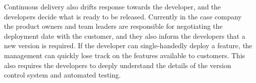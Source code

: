 \documentclass[english]{tktltiki2}
\theoremstyle{definition}
\theoremstyle{remark}
\begin{document}

Continuous delivery also drifts response towards the developer, and the developers decide what is ready to be released. Currently in the case company the product owners and team leaders are responsible for negotiating the deployment date with the customer, and they also inform the developers that a new version is required. If the developer can single-handedly deploy a feature, the management can quickly lose track on the features available to customers. This also requires the developers to deeply understand the details of the version control system and automated testing. 





\end{document}
